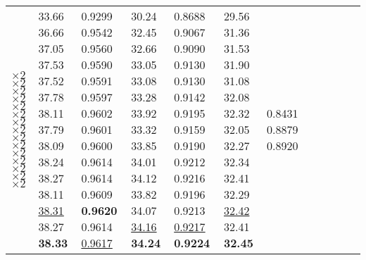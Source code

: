 \documentclass[runningheads]{llncs}
\begin{document}
\begin{table}[!ht]
\begin{tabular}{|p{7em}|p{2.5em}|p{2.5em}|p{3em}|p{2.5em}|p{3em}|p{2.5em}|p{3em}|p{2.5em}|p{3em}|p{2.5em}|p{3em}|}
		$\times2$ \newline{}$\times2$ \newline{}$\times2$ \newline{}$\times2$ \newline{}$\times2$ \newline{}$\times2$ \newline{}$\times2$ \newline{}$\times2$ \newline{}$\times2$ \newline{}$\times2$ \newline{}$\times2$ $\times2$ \newline{} $\times2$ \newline{} $\times2$ \newline{} $\times2$ & 33.66 \newline{}36.66 \newline{}37.05 \newline{}37.53 \newline{}37.52 \newline{}37.78 \newline{}38.11 \newline{}37.79 \newline{}38.09 \newline{}38.24 \newline{}38.27 \newline{}38.11 \newline{}\underline{38.31} \newline{}38.27 \newline{}\bfseries{38.33} & 0.9299 \newline{}0.9542 \newline{}0.9560 \newline{}0.9590 \newline{}0.9591 \newline{}0.9597 \newline{}0.9602 \newline{}0.9601 \newline{}0.9600 \newline{}0.9614 \newline{}0.9614 \newline{}0.9609 \newline{}\textbf{0.9620} \newline{}0.9614 \newline{}\underline{0.9617}  & 30.24 \newline{}32.45 \newline{}32.66 \newline{}33.05 \newline{}33.08 \newline{}33.28 \newline{}33.92 \newline{}33.32 \newline{}33.85 \newline{}34.01 \newline{}34.12 \newline{}33.82 \newline{}34.07 \newline{}\underline{34.16} \newline{}\bfseries{34.24}  & 0.8688 \newline{}0.9067 \newline{}0.9090 \newline{}0.9130 \newline{}0.9130 \newline{}0.9142 \newline{}0.9195 \newline{}0.9159 \newline{}0.9190 \newline{}0.9212 \newline{}0.9216 \newline{}0.9196 \newline{}0.9213 \newline{}\underline{0.9217} \newline{}\bfseries{0.9224} & 29.56 \newline{}31.36 \newline{}31.53 \newline{}31.90 \newline{}31.08 \newline{}32.08 \newline{}32.32 \newline{}32.05 \newline{}32.27 \newline{}32.34 \newline{}32.41 \newline{}32.29 \newline{}\underline{32.42} \newline{}32.41 \newline{}\bfseries{32.45} & 0.8431 \newline{}0.8879 \newline{}0.8920 
\end{tabular}
\end{table}
\end{document}
